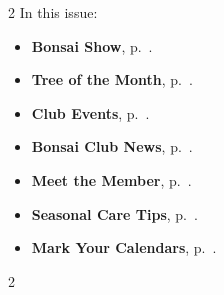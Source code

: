\setlength{\columnsep}{-5.0cm}
\begin{multicols}{2}
    \noindent\textsf{In this issue:}
    \begin{itemize}
        \item \textsf{\textbf{Bonsai Show}}, p.~\pageref{2025-10-show}.
        \item \textsf{\textbf{Tree of the Month}}, p.~\pageref{2025-10-contest}.
        \item \textsf{\textbf{Club Events}}, p.~\pageref{2025-10-calendar}.
        \item \textsf{\textbf{Bonsai Club News}}, p.~\pageref{2025-10-news}.
        \item \textsf{\textbf{Meet the Member}}, p.~\pageref{2025-10-roots}.
        \item \textsf{\textbf{Seasonal Care Tips}}, p.~\pageref{2025-10-care}.
        \item \textsf{\textbf{Mark Your Calendars}}, p.~\pageref{2025-10-events}.
    \end{itemize}
    \vfill\null
    \columnbreak

    
\end{multicols}
\pagebreak

\setlength{\columnsep}{0.5cm}
\begin{multicols}{2}
    
    
    
    
    
    
    
\end{multicols}
